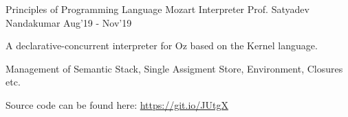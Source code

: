 
\begin{cventries}
  \cventry
  {Principles of Programming Language}
  {Mozart Interpreter}
  {Prof. Satyadev Nandakumar}
  {Aug'19 - Nov'19}
  {
    \begin{cvitems}
    \item A declarative-concurrent interpreter for Oz based on the Kernel language.
    \item Management of Semantic Stack, Single Assigment Store, Environment, Closures etc.
    \item Source code can be found here: \href{https://git.io/JUtgX}{https://git.io/JUtgX}
    \end{cvitems}
  }

\end{cventries}

